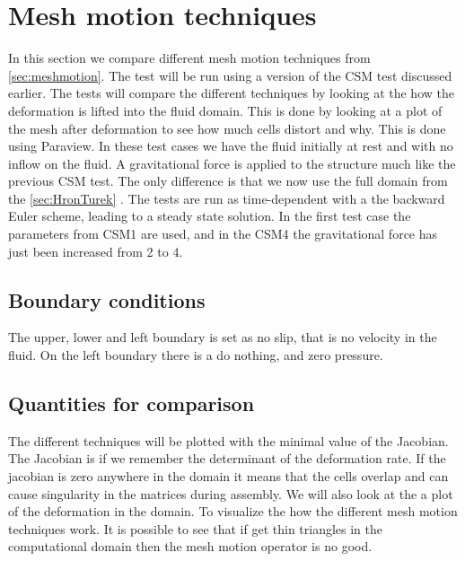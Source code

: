 \section{Mesh motion techniques}
In this section we compare different mesh motion techniques from \ref{sec:meshmotion}. The test will be run using a version of the CSM test discussed earlier. The tests will compare the different techniques by looking at the how the deformation is lifted into the fluid domain. This is done by looking at a plot of the mesh after deformation to see how much cells distort and why. This is done using Paraview.\newline
In these test cases we have the fluid initially at rest and with no inflow on the fluid. A gravitational force is applied to the structure much like the previous CSM test. The only difference is that we now use the full domain from the \ref{sec:HronTurek} . The tests are run as time-dependent with a the backward Euler scheme, leading to a steady state solution. In the first test case the parameters from CSM1 are used, and in the CSM4 the gravitational force has just been increased from 2 to 4. 
\subsection*{Boundary conditions}
The upper, lower and left boundary is set as no slip, that is no velocity in the fluid. On the left boundary there is a do nothing, and zero pressure. 
\subsection*{Quantities for comparison}
The different techniques will be plotted with the minimal value of the Jacobian. The Jacobian is if we remember the determinant of the deformation rate. If the jacobian is zero anywhere in the domain it means that the cells overlap and can cause singularity in the matrices during assembly. \newline
We will also look at the a plot of the deformation in the domain. To visualize the how the different mesh motion techniques work. It is possible to see that if get thin triangles in the computational domain then the mesh motion operator is no good. 
